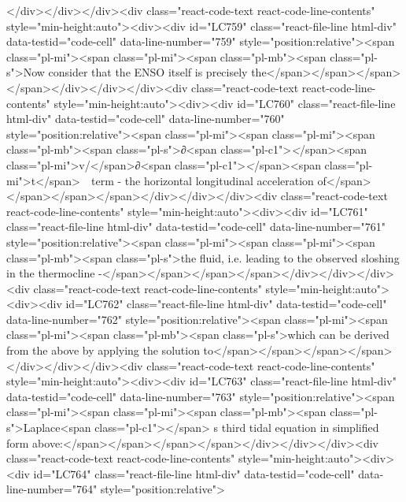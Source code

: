 {{{{{{{{</div></div></div><div class="react-code-text react-code-line-contents" style="min-height:auto"><div><div id="LC759" class="react-file-line html-div" data-testid="code-cell" data-line-number="759" style="position:relative"><span class="pl-mi"><span class="pl-mi"><span class="pl-mb"><span class="pl-s">Now consider that the ENSO itself is precisely the</span></span></span></span></div></div></div><div class="react-code-text react-code-line-contents" style="min-height:auto"><div><div id="LC760" class="react-file-line html-div" data-testid="code-cell" data-line-number="760" style="position:relative"><span class="pl-mi"><span class="pl-mi"><span class="pl-mb"><span class="pl-s">∂<span class="pl-c1">\emph</span>{<span class="pl-mi">v/</span>}∂<span class="pl-c1">\emph</span>{<span class="pl-mi">t</span>}~~term - the horizontal longitudinal acceleration of</span></span></span></span></div></div></div><div class="react-code-text react-code-line-contents" style="min-height:auto"><div><div id="LC761" class="react-file-line html-div" data-testid="code-cell" data-line-number="761" style="position:relative"><span class="pl-mi"><span class="pl-mi"><span class="pl-mb"><span class="pl-s">the fluid, i.e. leading to the observed sloshing in the thermocline -</span></span></span></span></div></div></div><div class="react-code-text react-code-line-contents" style="min-height:auto"><div><div id="LC762" class="react-file-line html-div" data-testid="code-cell" data-line-number="762" style="position:relative"><span class="pl-mi"><span class="pl-mi"><span class="pl-mb"><span class="pl-s">which can be derived from the above by applying the solution to</span></span></span></span></div></div></div><div class="react-code-text react-code-line-contents" style="min-height:auto"><div><div id="LC763" class="react-file-line html-div" data-testid="code-cell" data-line-number="763" style="position:relative"><span class="pl-mi"><span class="pl-mi"><span class="pl-mb"><span class="pl-s">Laplace<span class="pl-c1">\textquotesingle</span> s third tidal equation in simplified form above:</span></span></span></span></div></div></div><div class="react-code-text react-code-line-contents" style="min-height:auto"><div><div id="LC764" class="react-file-line html-div" data-testid="code-cell" data-line-number="764" style="position:relative">
}}}}}}}}

